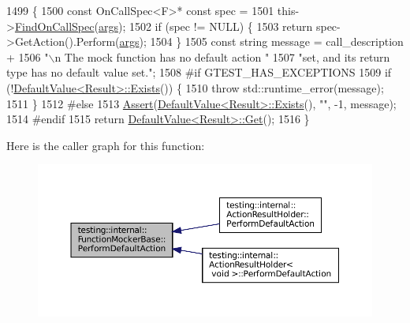 \begin{DoxyCode}
1499                                                                     \{
1500     \textcolor{keyword}{const} OnCallSpec<F>* \textcolor{keyword}{const} spec =
1501         this->\hyperlink{classtesting_1_1internal_1_1FunctionMockerBase_a3bcd2e8191ffc44bd59b8d8d25eefd3e}{FindOnCallSpec}(\hyperlink{namespacegenerate__debs_a75f9143e38df82d83b2e8a6f99cae02c}{args});
1502     \textcolor{keywordflow}{if} (spec != NULL) \{
1503       \textcolor{keywordflow}{return} spec->GetAction().Perform(\hyperlink{namespacegenerate__debs_a75f9143e38df82d83b2e8a6f99cae02c}{args});
1504     \}
1505     \textcolor{keyword}{const} \textcolor{keywordtype}{string} message = call\_description +
1506         \textcolor{stringliteral}{"\(\backslash\)n    The mock function has no default action "}
1507         \textcolor{stringliteral}{"set, and its return type has no default value set."};
1508 \textcolor{preprocessor}{#if GTEST\_HAS\_EXCEPTIONS}
1509     \textcolor{keywordflow}{if} (!\hyperlink{classtesting_1_1DefaultValue_aec1ff9b510af7dbb86c837fd2409fd70}{DefaultValue<Result>::Exists}()) \{
1510       \textcolor{keywordflow}{throw} std::runtime\_error(message);
1511     \}
1512 \textcolor{preprocessor}{#else}
1513     \hyperlink{namespacetesting_1_1internal_a7a259643b7f2d23ce2b757728df42c99}{Assert}(\hyperlink{classtesting_1_1DefaultValue_aec1ff9b510af7dbb86c837fd2409fd70}{DefaultValue<Result>::Exists}(), \textcolor{stringliteral}{""}, -1, message);
1514 \textcolor{preprocessor}{#endif}
1515     \textcolor{keywordflow}{return} \hyperlink{classtesting_1_1DefaultValue_a4dc6dfee4cbc9cdb36f5c9cde5cf2b83}{DefaultValue<Result>::Get}();
1516   \}
\end{DoxyCode}
Here is the caller graph for this function\+:
\nopagebreak
\begin{figure}[H]
\begin{center}
\leavevmode
\includegraphics[width=350pt]{classtesting_1_1internal_1_1FunctionMockerBase_adbef6e1af840c9c14c3a6acee01007b2_icgraph}
\end{center}
\end{figure}
\mbox{\label{classtesting_1_1internal_1_1FunctionMockerBase_ad0183c6e8ec34498eb52f4249ec2fe9d}} 
